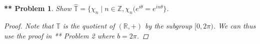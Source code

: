 \documentclass{article}
\newtheorem{**}{** Problem}
\begin{document}
\begin{**}
Show $\widehat{\mathbb{T}} = \{\chi_n \mid n \in \mathbb{Z}, \chi_n(e^{i \theta} = e^{i n \theta}\}$.
\begin{proof}
Note that $\mathbb{T}$ is the quotient of $(\mathbb{R}, +)$ by the subgroup $[0, 2 \pi)$. We can thus use the proof in ** Problem 2 where $b = 2 \pi$.
\end{proof}
\end{**}
\end{document}
